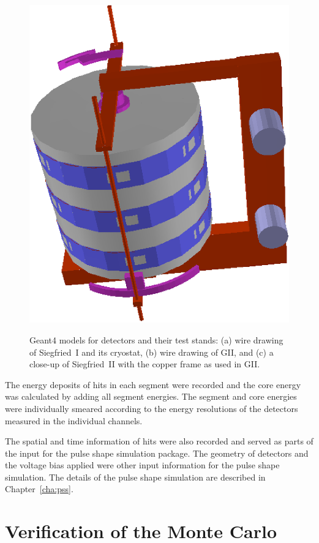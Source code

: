 \begin{figure}[tbhp]
{\includegraphics[height=0.2\textheight,clip]{SIIsolid}}
\caption{Geant4 models for detectors and their test stands: (a) wire
drawing of Siegfried~I and its cryostat, (b) wire drawing of GII, and
(c) a close-up of Siegfried~II with the copper frame as used in GII.}
\label{fig:ph:sim}
\end{figure}

The energy deposits of hits in each segment were recorded and the core
energy was calculated by adding all segment energies. The segment and
core energies were individually smeared according to the energy
resolutions of the detectors measured in the individual channels.

The spatial and time information of hits were also recorded and served
as parts of the input for the pulse shape simulation package. The
geometry of detectors and the voltage bias applied were other input
information for the pulse shape simulation. The details of the pulse
shape simulation are described in Chapter~\ref{cha:pss}.

\section{Verification of the Monte Carlo}
\label{sec:ph:var}

